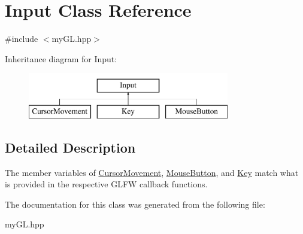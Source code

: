 \hypertarget{classInput}{}\section{Input Class Reference}
\label{classInput}


{\ttfamily \#include $<$my\+G\+L.\+hpp$>$}

Inheritance diagram for Input\+:\begin{figure}[H]
\begin{center}
\leavevmode
\includegraphics[height=2.000000cm]{classInput}
\end{center}
\end{figure}


\subsection{Detailed Description}
The member variables of \hyperlink{classCursorMovement}{Cursor\+Movement}, \hyperlink{classMouseButton}{Mouse\+Button}, and \hyperlink{classKey}{Key} match what is provided in the respective G\+L\+FW callback functions. 

The documentation for this class was generated from the following file\+:\begin{DoxyCompactItemize}
\item 
my\+G\+L.\+hpp\end{DoxyCompactItemize}
